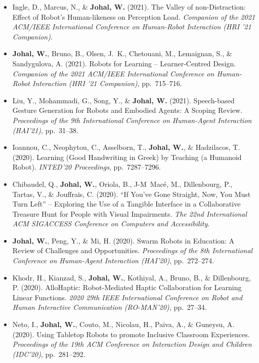 \begin{itemize}[nosep]
    \item Ingle, D., Marcus, N., \& \textbf{Johal, W.} (2021). The Valley of non-Distraction: Effect of Robot's Human-likeness on Perception Load. \textit{Companion of the 2021 ACM/IEEE International Conference on Human-Robot Interaction (HRI '21 Companion)}.

    \item \textbf{Johal, W.}, Bruno, B., Olsen, J.\ K., Chetouani, M., Lemaignan, S., \& Sandygulova, A. (2021). Robots for Learning -- Learner-Centred Design. \textit{Companion of the 2021 ACM/IEEE International Conference on Human-Robot Interaction (HRI '21 Companion)}, pp.\ 715--716.

    \item Liu, Y., Mohammadi, G., Song, Y., \& \textbf{Johal, W.} (2021). Speech-based Gesture Generation for Robots and Embodied Agents: A Scoping Review. \textit{Proceedings of the 9th International Conference on Human-Agent Interaction (HAI'21)}, pp.\ 31--38.

    \item Ioannou, C., Neophytou, C., Asselborn, T., \textbf{Johal, W.}, \& Hadzilacos, T. (2020). Learning (Good Handwriting in Greek) by Teaching (a Humanoid Robot). \textit{INTED'20 Proceedings}, pp.\ 7287--7296.

    \item Chibaudel, Q., \textbf{Johal, W.}, Oriola, B., J-M\ Macé, M., Dillenbourg, P., Tartas, V., \& Jouffrais, C. (2020). ``If You've Gone Straight, Now, You Must Turn Left'' -- Exploring the Use of a Tangible Interface in a Collaborative Treasure Hunt for People with Visual Impairments. \textit{The 22nd International ACM SIGACCESS Conference on Computers and Accessibility}.

    \item \textbf{Johal, W.}, Peng, Y., \& Mi, H. (2020). Swarm Robots in Education: A Review of Challenges and Opportunities. \textit{Proceedings of the 8th International Conference on Human-Agent Interaction (HAI'20)}, pp.\ 272--274.

    \item Khodr, H., Kianzad, S., \textbf{Johal, W.}, Kothiyal, A., Bruno, B., \& Dillenbourg, P. (2020). AlloHaptic: Robot-Mediated Haptic Collaboration for Learning Linear Functions. \textit{2020 29th IEEE International Conference on Robot and Human Interactive Communication (RO-MAN'20)}, pp.\ 27--34.

    \item Neto, I., \textbf{Johal, W.}, Couto, M., Nicolau, H., Paiva, A., \& Guneysu, A. (2020). Using Tabletop Robots to promote Inclusive Classroom Experiences. \textit{Proceedings of the 19th ACM Conference on Interaction Design and Children (IDC'20)}, pp.\ 281--292.


\end{itemize}
